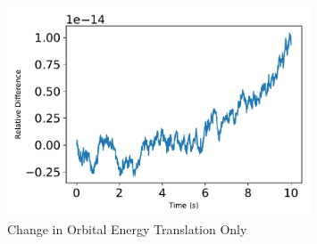 \begin{figure}[htbp]\centerline{\includegraphics[width=0.8\textwidth]{AutoTeX/scPlusChangeInOrbitalEnergyTranslationOnly}}\caption{Change in Orbital Energy Translation Only}\label{fig:scPlusChangeInOrbitalEnergyTranslationOnly}\end{figure}
